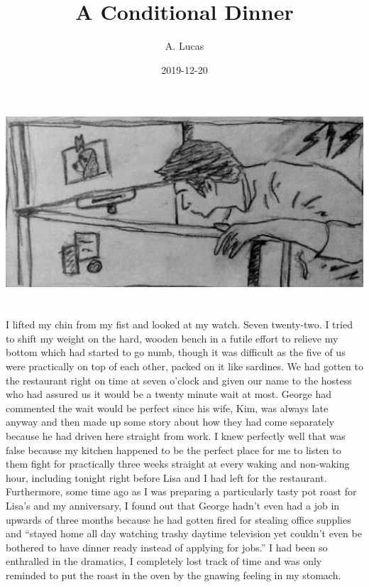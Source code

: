 \documentclass[]{book}
\title{A Conditional Dinner}
\author{A. Lucas}
\date{2019-12-20}
\begin{document}
\maketitle

{
\setcounter{tocdepth}{1}
\tableofcontents
}
\chapter*{}\label{section}

\begin{flushleft}\includegraphics[width=0.5\linewidth]{images/titleimage} \end{flushleft}

\chapter{}\label{section-1}

I lifted my chin from my fist and looked at my watch. Seven twenty-two.
I tried to shift my weight on the hard, wooden bench in a futile effort
to relieve my bottom which had started to go numb, though it was
difficult as the five of us were practically on top of each other,
packed on it like sardines. We had gotten to the restaurant right on
time at seven o'clock and given our name to the hostess who had assured
us it would be a twenty minute wait at most. George had commented the
wait would be perfect since his wife, Kim, was always late anyway and
then made up some story about how they had come separately because he
had driven here straight from work. I knew perfectly well that was false
because my kitchen happened to be the perfect place for me to listen to
them fight for practically three weeks straight at every waking and
non-waking hour, including tonight right before Lisa and I had left for
the restaurant. Furthermore, some time ago as I was preparing a
particularly tasty pot roast for Lisa's and my anniversary, I found out
that George hadn't even had a job in upwards of three months because he
had gotten fired for stealing office supplies and ``stayed home all day
watching trashy daytime television yet couldn't even be bothered to have
dinner ready instead of applying for jobs.'' I had been so enthralled in
the dramatics, I completely lost track of time and was only reminded to
put the roast in the oven by the gnawing feeling in my stomach.
\end{document}
